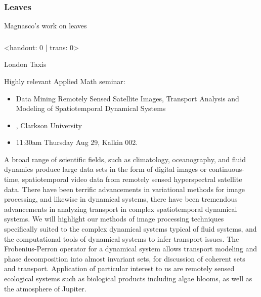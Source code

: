 \begin{frame}
  \frametitle{Leaves}

  Magnasco's work on leaves

\end{frame}

\begin{frame}
  \frametitle{}

\end{frame}

\begin{frame}<handout: 0 | trans: 0>


\end{frame}




\begin{frame}
  London Taxis
\end{frame}

\begin{frame}

  \begin{block}{Highly relevant Applied Math seminar:}
    \begin{itemize}
    \item 
       Data Mining Remotely Sensed Satellite Images,
      Transport Analysis and Modeling of Spatiotemporal Dynamical Systems
    \item 
      ,
      Clarkson University
    \item
       11:30am Thursday Aug 29, Kalkin 002.
    \end{itemize}
  \end{block}

  \begin{block}{}
    {\tiny %
       A broad range of scientific fields, such as
      climatology, oceanography, and fluid dynamics produce large data sets
      in the form of digital images or continuous-time, spatiotemporal video
      data from remotely sensed hyperspectral satellite data.  There have
      been terrific advancements in variational methods for image
      processing, and likewise in dynamical systems, there have been
      tremendous advancements in analyzing transport in complex
      spatiotemporal dynamical systems.  We will highlight our methods of
      image processing techniques specifically suited to the complex
      dynamical systems typical of fluid systems, and the computational
      tools of dynamical systems to infer transport issues. The
      Frobenius-Perron operator for a dynamical system allows transport
      modeling and phase decomposition into almost invariant sets, for
      discussion of coherent sets and transport.  Application of particular
      interest to us are remotely sensed ecological systems such as
      biological products including algae blooms, as well as the atmosphere
      of Jupiter.}
  \end{block}

\end{frame}


